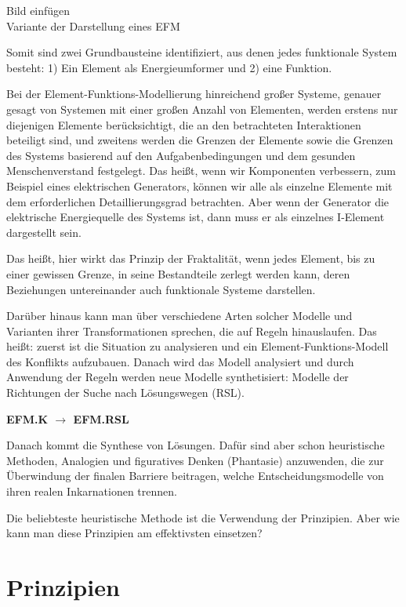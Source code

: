 \documentclass[11pt,a4paper]{article}
\begin{document}
\begin{center}
  Bild einfügen\\ Variante der Darstellung eines EFM
\end{center}
Somit sind zwei Grundbausteine identifiziert, aus denen jedes funktionale
System besteht: 1) Ein Element als Energieumformer und 2) eine Funktion.

Bei der Element-Funktions-Modellierung hinreichend großer Systeme, genauer
gesagt von Systemen mit einer großen Anzahl von Elementen, werden erstens nur
diejenigen Elemente berücksichtigt, die an den betrachteten Interaktionen
beteiligt sind, und zweitens werden die Grenzen der Elemente sowie die Grenzen
des Systems basierend auf den Aufgabenbedingungen und dem gesunden
Menschenverstand festgelegt. Das heißt, wenn wir Komponenten verbessern, zum
Beispiel eines elektrischen Generators, können wir alle als einzelne Elemente
mit dem erforderlichen Detaillierungsgrad betrachten. Aber wenn der Generator
die elektrische Energiequelle des Systems ist, dann muss er als einzelnes
I-Element dargestellt sein.

Das heißt, hier wirkt das Prinzip der Fraktalität, wenn jedes Element, bis zu
einer gewissen Grenze, in seine Bestandteile zerlegt werden kann, deren
Beziehungen untereinander auch funktionale Systeme darstellen.

Darüber hinaus kann man über verschiedene Arten solcher Modelle und Varianten
ihrer Transformationen sprechen, die auf Regeln hinauslaufen. Das heißt:
zuerst ist die Situation zu analysieren und ein Element-Funktions-Modell des
Konflikts aufzubauen. Danach wird das Modell analysiert und durch Anwendung
der Regeln werden neue Modelle synthetisiert: Modelle der Richtungen der Suche
nach Lösungswegen (RSL).
\begin{center}\bf   EFM.K $\to$ EFM.RSL \end{center}
Danach kommt die Synthese von Lösungen. Dafür sind aber schon heuristische
Methoden, Analogien und figuratives Denken (Phantasie) anzuwenden, die zur
Überwindung der finalen Barriere beitragen, welche Entscheidungsmodelle von
ihren realen Inkarnationen trennen.

Die beliebteste heuristische Methode ist die Verwendung der Prinzipien. Aber
wie kann man diese Prinzipien am effektivsten einsetzen?

\section*{Prinzipien}
\end{document}
